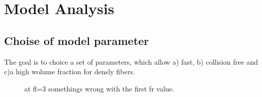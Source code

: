\chapter{Model Analysis}
\label{cha:model_analysis}
% 
\section{Choise of model parameter}
% 
The goal is to choice a set of parameters, which allow a) fast, b) collision free and c)a high wolume fraction for densly fibers. 
% 
\begin{figure}[!tb]
\centering
{}
\caption{at fl=3 somethings wrong with the first fr value.}
\end{figure}
% 
\